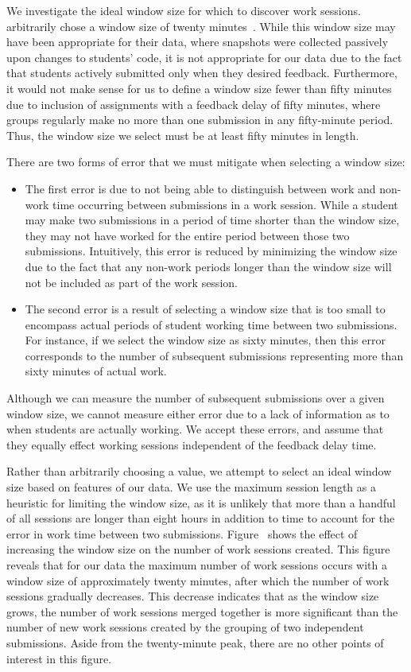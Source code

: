We investigate the ideal window size for which to discover work
sessions. \spacco{} arbitrarily chose a window size of twenty
minutes~\cite{Spacco:2013:TIP:2462476.2465594}. While this window size may have
been appropriate for their data, where snapshots were collected passively upon
changes to students' code, it is not appropriate for our data due to the fact
that students actively submitted only when they desired feedback. Furthermore,
it would not make sense for us to define a window size fewer than fifty minutes
due to inclusion of assignments with a feedback delay of fifty minutes, where
groups regularly make no more than one submission in any fifty-minute
period. Thus, the window size we select must be at least fifty minutes in
length.

There are two forms of error that we must mitigate when selecting a window
size:

\begin{itemize}
\item The first error is due to not being able to distinguish between work and
  non-work time occurring between submissions in a work session. While a
  student may make two submissions in a period of time shorter than the window
  size, they may not have worked for the entire period between those two
  submissions. Intuitively, this error is reduced by minimizing the window size
  due to the fact that any non-work periods longer than the window size will
  not be included as part of the work session.
\item The second error is a result of selecting a window size that is too small
  to encompass actual periods of student working time between two submissions.
  For instance, if we select the window size as sixty minutes, then this error
  corresponds to the number of subsequent submissions representing more than
  sixty minutes of actual work.
\end{itemize}

Although we can measure the number of subsequent submissions over a given
window size, we cannot measure either error due to a lack of information as to
when students are actually working. We accept these errors, and assume that
they equally effect working sessions independent of the feedback delay
time.

Rather than arbitrarily choosing a value, we attempt to select an ideal window
size based on features of our data. We use the maximum session length as a
heuristic for limiting the window size, as it is unlikely that more than a
handful of all sessions are longer than eight hours in addition to time to
account for the error in work time between two
submissions. Figure~ shows the effect of increasing
the window size on the number of work sessions created. This figure reveals
that for our data the maximum number of work sessions occurs with a window size
of approximately twenty minutes, after which the number of work sessions
gradually decreases. This decrease indicates that as the window size grows, the
number of work sessions merged together is more significant than the number of
new work sessions created by the grouping of two independent submissions. Aside
from the twenty-minute peak, there are no other points of interest in this
figure.

